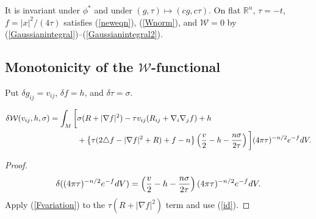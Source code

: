It is invariant under $\phi^*$ and under $(g,\tau)\mapsto(cg,c\tau)$. On flat
$\mathbb R^n$, $\tau=-t$, $f=|x|^2/(4\tau)$ satisfies (\ref{neweqn}), (\ref{Wnorm}),
and ${\mathcal W}=0$ by (\ref{Gaussianintegral})--(\ref{Gaussianintegral2}).

\subsection{Monotonicity of the ${\mathcal W}$-functional}

Put $\delta g_{ij}=v_{ij}$, $\delta f=h$, and $\delta\tau=\sigma$.
\begin{proposition}
  \label{prop:kl-w-entropy-first-variation-w-entropy}
\begin{align}
\delta {\mathcal W}(v_{ij},h,\sigma)=\int_M\bigg[&\sigma(R+|\nabla f|^2)-\tau v_{ij}(R_{ij}+\nabla_i\nabla_jf)+h\\
&+\left\{\tau(2\triangle f-|\nabla f|^2+R)+f-n\right\}\left({v\over2}-h-{n\sigma\over2\tau}\right)\bigg](4\pi\tau)^{-n/2}e^{-f}dV.
\end{align}
\end{proposition}
\begin{proof}
\sketch
\begin{equation}
\delta((4\pi\tau)^{-n/2}e^{-f}dV)=\left({v\over2}-h-{n\sigma\over2\tau}\right)(4\pi\tau)^{-n/2}e^{-f}dV.
\end{equation}
Apply (\ref{Fvariation}) to the $\tau(R+|\nabla f|^2)$ term and use (\ref{id}).
\end{proof}

